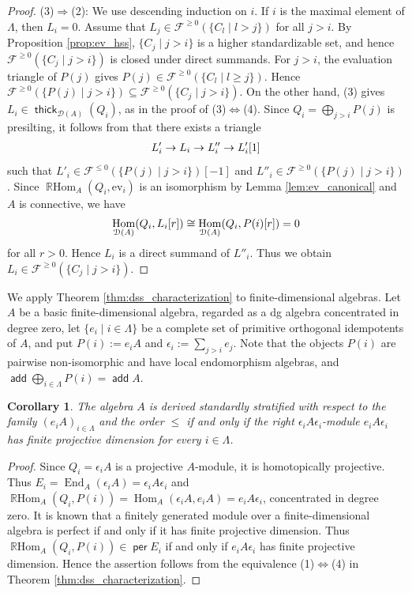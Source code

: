 \documentclass[a4paper,reqno,11pt]{amsart}
\numberwithin{equation}{section}
\newtheorem{corollary}[theorem]{Corollary}
\theoremstyle{definition}
\newcommand{\D}{\mathcal{D}}
\newcommand{\F}{\mathcal{F}}
\newcommand{\e}{\epsilon}
\newcommand{\ev}{\mathrm{ev}}
\DeclareMathOperator{\add}{\mathsf{add}}
\DeclareMathOperator{\thick}{\mathsf{thick}}
\DeclareMathOperator{\per}{\mathsf{per}}
\DeclareMathOperator{\End}{End}
\DeclareMathOperator{\Hom}{Hom}
\DeclareMathOperator{\RHom}{\mathbb{R}Hom}
\begin{document}
\begin{proof}
(3)$\Rightarrow$(2): We use descending induction on $i$.
If $i$ is the maximal element of $\Lambda$, then $L_{i}=0$.
Assume that $L_{j}\in\F^{\geq 0}(\{C_{l}\mid l>j\})$ for all $j>i$.
By Proposition \ref{prop:ev_hss}, $\{C_{j}\mid j>i\}$ is a higher standardizable set, and hence $\F^{\geq 0}(\{C_{j}\mid j>i\})$ is closed under direct summands.
For $j>i$, the evaluation triangle of $P(j)$ gives $P(j)\in\F^{\geq 0}(\{C_{l}\mid l\geq j\})$.
Hence $\F^{\geq 0}(\{P(j)\mid j>i\})\subseteq\F^{\geq 0}(\{C_{j}\mid j>i\})$.
On the other hand, (3) gives $L_{i}\in\thick_{\D(A)}(Q_{i})$, as in the proof of (3)$\Leftrightarrow$(4).
Since $Q_{i}=\bigoplus_{j>i}P(j)$ is presilting, it follows from \cite[Proposition 2.8(a)]{IY18} that there exists a triangle
\begin{align}
L'_{i}\to L_{i}\to L''_{i}\to L'_{i}[1]\notag
\end{align}
such that $L'_{i}\in \F^{\leq 0}(\{P(j)\mid j>i\})[-1]$ and $L''_{i}\in \F^{\geq 0}(\{P(j)\mid j>i\})$.
Since $\RHom_{A}(Q_{i},\ev_{i})$ is an isomorphism by Lemma \ref{lem:ev_canonical} and $A$ is connective, we have
\begin{align}
\Hom_{\D(A)}(Q_{i},L_{i}[r])\cong\Hom_{\D(A)}(Q_{i},P(i)[r])=0\notag
\end{align}
for all $r>0$.
Hence $L_{i}$ is a direct summand of $L''_{i}$.
Thus we obtain $L_{i}\in \F^{\geq 0}(\{C_{j}\mid j>i\})$.
\end{proof}

We apply Theorem \ref{thm:dss_characterization} to finite-dimensional algebras.
Let $A$ be a basic finite-dimensional algebra, regarded as a dg algebra concentrated in degree zero, let $\{e_{i}\mid i\in\Lambda\}$ be a complete set of primitive orthogonal idempotents of $A$, and put $P(i):=e_{i}A$ and $\e_{i}:=\sum_{j>i}e_{j}$. Note that the objects $P(i)$ are pairwise non-isomorphic and have local endomorphism algebras, and $\add\bigoplus_{i\in\Lambda}P(i)=\add A$.

\begin{corollary}\label{cor:fd_criterion}
The algebra $A$ is derived standardly stratified with respect to the family $(e_{i}A)_{i\in\Lambda}$ and the order $\leq$ if and only if the right $\e_{i}A\e_{i}$-module $e_{i}A\e_{i}$ has finite projective dimension for every $i\in\Lambda$.
\end{corollary}
\begin{proof}
Since $Q_{i}=\e_{i}A$ is a projective $A$-module, it is homotopically projective. 
Thus $E_{i}=\End_{A}(\e_{i}A)=\e_{i}A\e_{i}$ and $\RHom_{A}(Q_{i},P(i))=\Hom_{A}(\e_{i}A,e_{i}A)=e_{i}A\e_{i}$, concentrated in degree zero.
It is known that a finitely generated module over a finite-dimensional algebra is perfect if and only if it has finite projective dimension.
Thus $\RHom_{A}(Q_{i},P(i))\in \per E_{i}$ if and only if $e_{i}A\e_{i}$ has finite projective dimension.
Hence the assertion follows from the equivalence (1)$\Leftrightarrow$(4) in Theorem \ref{thm:dss_characterization}.
\end{proof}
\end{document}
